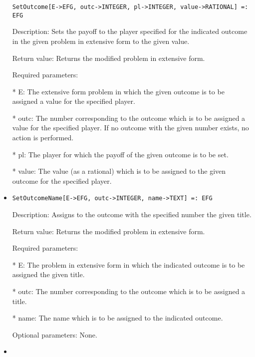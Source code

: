 \begin{itemize}
\begin{verbatim} 
SetOutcome[E->EFG, outc->INTEGER, pl->INTEGER, value->RATIONAL] =: EFG
\end{verbatim}

\bd
\item
[Description:] Sets the payoff to the player specified for the indicated
outcome in the given problem in extensive form to the given value.
\item
[Return value:] Returns the modified problem in extensive form.
\item
[Required parameters:]\hfil\null
	
\bd
\item
[* E:] The extensive form problem in which the given outcome is to be
assigned a value for the specified player.
\item
[* outc:] The number corresponding to the outcome which is to be 
assigned a value for the specified player.  If no outcome with
the given number exists, no action is performed.
\item
[* pl:] The player for which the payoff of the given outcome is to be
set.
\item
[* value:] The value (as a rational) which is to be assigned to the 
given outcome for the specified player.
\ed
\ed

\item

\begin{verbatim}
SetOutcomeName[E->EFG, outc->INTEGER, name->TEXT] =: EFG
\end{verbatim}

\bd
\item
[Description:] Assigns to the outcome with the specified number the 
given title.
\item
[Return value:] Returns the modified problem in extensive form.
\item
[Required parameters:]\hfil\null
	
\bd
\item
[* E:] The problem in extensive form in which the indicated outcome 
is to be assigned the given title.
\item
[* outc:] The number corresponding to the outcome which is to be 
assigned a title.
\item
[* name:] The name which is to be assigned to the indicated outcome.
\ed

\item
[Optional parameters:] None.
\ed

\item


\end{itemize}

